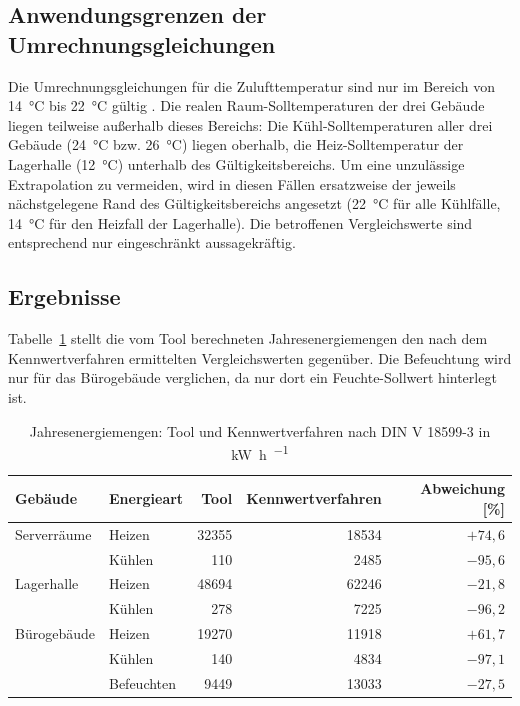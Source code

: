 \documentclass{scrreprt}
\begin{document}
\subsection{Anwendungsgrenzen der Umrechnungsgleichungen}
Die Umrechnungsgleichungen für die Zulufttemperatur sind nur im
Bereich von \SI{14}{\celsius} bis \SI{22}{\celsius} gültig
\parencite{DIN185993}. Die realen Raum-Solltemperaturen der drei
Gebäude liegen teilweise außerhalb dieses Bereichs: Die
Kühl-Solltemperaturen aller drei Gebäude (\SI{24}{\celsius} bzw.
\SI{26}{\celsius}) liegen oberhalb, die Heiz-Solltemperatur der
Lagerhalle (\SI{12}{\celsius}) unterhalb des Gültigkeitsbereichs. Um
eine unzulässige Extrapolation zu vermeiden, wird in diesen Fällen
ersatzweise der jeweils nächstgelegene Rand des Gültigkeitsbereichs
angesetzt (\SI{22}{\celsius} für alle Kühlfälle, \SI{14}{\celsius} für
den Heizfall der Lagerhalle). Die betroffenen Vergleichswerte sind
entsprechend nur eingeschränkt aussagekräftig.

\subsection{Ergebnisse}
Tabelle~\ref{tab:VergleichKennwertverfahren} stellt die vom Tool
berechneten Jahresenergiemengen den nach dem Kennwertverfahren
ermittelten Vergleichswerten gegenüber. Die Befeuchtung wird nur für
das Bürogebäude verglichen, da nur dort ein Feuchte-Sollwert
hinterlegt ist.

\begin{table}[H]
    \centering
    \caption{Jahresenergiemengen: Tool und Kennwertverfahren nach DIN V 18599-3 in \si{\kilo\watt\hour\per\year}}
    \label{tab:VergleichKennwertverfahren}
    \begin{tabular}{llrrr}
        \toprule
        Gebäude & Energieart & Tool & Kennwertverfahren & Abweichung [\%] \\
        \midrule
        Serverräume & Heizen & \num{32355} & \num{18534} & $+74{,}6$ \\
                    & Kühlen & \num{110} & \num{2485} & $-95{,}6$ \\
        \midrule
        Lagerhalle & Heizen & \num{48694} & \num{62246} & $-21{,}8$ \\
                   & Kühlen & \num{278} & \num{7225} & $-96{,}2$ \\
        \midrule
        Bürogebäude & Heizen & \num{19270} & \num{11918} & $+61{,}7$ \\
                    & Kühlen & \num{140} & \num{4834} & $-97{,}1$ \\
                    & Befeuchten & \num{9449} & \num{13033} & $-27{,}5$ \\
        \bottomrule
    \end{tabular}
\end{table}
\end{document}
